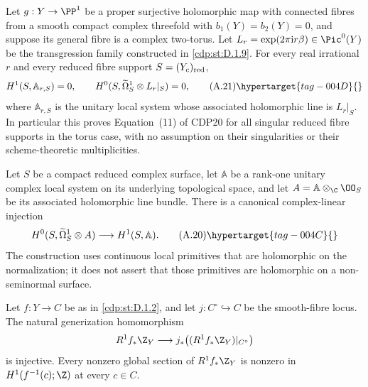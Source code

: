 
\begin{proposition}\hypertarget{tag-01AX}{}\label{cdp:st:A.4.8}


Let $g:Y\to\PP^1$ be a proper surjective holomorphic map with connected fibres from a smooth compact complex threefold with $b_1(Y)=b_2(Y)=0$, and suppose its general fibre is a complex two-torus. Let $L_r=\exp(2\pi\mathrm i r\beta)\in\Pic^0(Y)$ be the transgression family constructed in \ref{cdp:st:D.1.9}. For every real irrational $r$ and every reduced fibre support $S=(Y_c)_{\rm red}$,
\[
 H^1(S,\mathbb A_{r,S})=0,
 \qquad
 H^0(S,\widetilde\Omega_S^1\otimes L_r|_S)=0,
 \tag{A.21}\hypertarget{tag-004D}{}\label{cdp:eq:A.21}
\]
where $\mathbb A_{r,S}$ is the unitary local system whose associated holomorphic line is $L_r|_S$. In particular this proves Equation~(11) of CDP20 for all singular reduced fibre supports in the torus case, with no assumption on their singularities or their scheme-theoretic multiplicities.
\end{proposition}

\begin{proposition}\hypertarget{tag-01AW}{}\label{cdp:st:A.4.7}


Let $S$ be a compact reduced complex surface, let $\mathbb A$ be a rank-one unitary complex local system on its underlying topological space, and let $A=\mathbb A\otimes_{\C}\OO_S$ be its associated holomorphic line bundle. There is a canonical complex-linear injection
\[
 H^0(S,\widetilde\Omega_S^1\otimes A)
       \longrightarrow H^1(S,\mathbb A).
 \tag{A.20}\hypertarget{tag-004C}{}\label{cdp:eq:A.20}
\]
The construction uses continuous local primitives that are holomorphic on the normalization; it does not assert that those primitives are holomorphic on a non-seminormal surface.
\end{proposition}

\begin{proposition}\hypertarget{tag-01G6}{}\label{cdp:st:D.1.8}


Let $f:Y\to C$ be as in \ref{cdp:st:D.1.2}, and let $j:C^\circ\hookrightarrow C$
be the smooth-fibre locus. The natural generization homomorphism
\[
R^1f_*\Z_Y\longrightarrow
j_*\bigl((R^1f_*\Z_Y)|_{C^\circ}\bigr)
\]
is injective. Every nonzero global section of $R^1f_*\Z_Y$ is
nonzero in $H^1(f^{-1}(c);\Z)$ at every $c\in C$.
\end{proposition}

